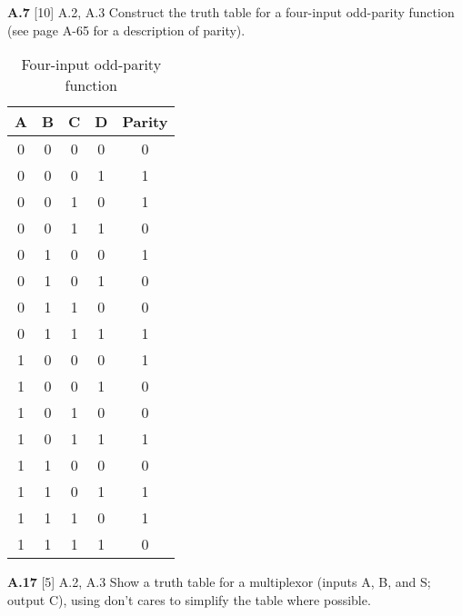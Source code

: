 \documentclass[fleqn]{article}
\begin{document}
\vspace{0.5in}
\textbf{A.7} [10] \textlangle A.2, A.3\textrangle \; Construct the truth table for a four-input odd-parity function (see page A-65 for a description of parity).
\vspace{0.125in}
\begin{addmargin}[0.15cm]{0cm}
\begin{table}[H]
\centering
\begin{tabular}{cccc|c}
\textbf{A} & \textbf{B} & \textbf{C} & \textbf{D} & \textbf{Parity} \\ \hline
0 & 0 & 0 & 0 & 0 \\
0 & 0 & 0 & 1 & 1 \\
0 & 0 & 1 & 0 & 1 \\
0 & 0 & 1 & 1 & 0 \\
0 & 1 & 0 & 0 & 1 \\
0 & 1 & 0 & 1 & 0 \\
0 & 1 & 1 & 0 & 0 \\
0 & 1 & 1 & 1 & 1 \\
1 & 0 & 0 & 0 & 1 \\
1 & 0 & 0 & 1 & 0 \\
1 & 0 & 1 & 0 & 0 \\
1 & 0 & 1 & 1 & 1 \\
1 & 1 & 0 & 0 & 0 \\
1 & 1 & 0 & 1 & 1 \\
1 & 1 & 1 & 0 & 1 \\
1 & 1 & 1 & 1 & 0
\end{tabular}
\caption{Four-input odd-parity function}
\end{table}
\end{addmargin}

\vspace{0.5in}

\textbf{A.17} [5] \textlangle A.2, A.3\textrangle \; Show a truth table for a multiplexor (inputs A, B, and S; output C), using don't cares to simplify the table where possible.
\vspace{0.125in}
\end{document}
